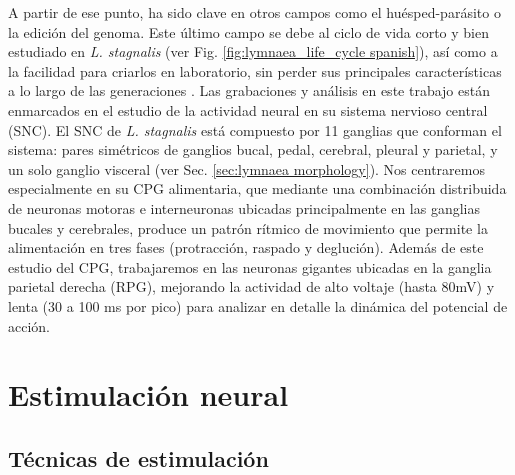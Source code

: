 A partir de ese punto, ha sido clave en otros campos como el huésped-parásito o la edición del genoma. Este último campo se debe al ciclo de vida corto y bien estudiado en \textit{L. stagnalis} (ver Fig. \ref{fig:lymnaea_life_cycle spanish}), así como a la facilidad para criarlos en laboratorio, sin perder sus principales características a lo largo de las generaciones \parencite{noland_observations_1946}. Las grabaciones y análisis en este trabajo están enmarcados en el estudio de la actividad neural en su sistema nervioso central (SNC). El SNC de \textit{L. stagnalis} está compuesto por 11 ganglias que conforman el sistema: pares simétricos de ganglios bucal, pedal, cerebral, pleural y parietal, y un solo ganglio visceral (ver Sec. \ref{sec:lymnaea morphology}). Nos centraremos especialmente en su CPG alimentaria, que mediante una combinación distribuida de neuronas motoras e interneuronas ubicadas principalmente en las ganglias bucales y cerebrales, produce un patrón rítmico de movimiento que permite la alimentación en tres fases (protracción, raspado y deglución). Además de este estudio del CPG, trabajaremos en las neuronas gigantes ubicadas en la ganglia parietal derecha (RPG), mejorando la actividad de alto voltaje (hasta 80mV) y lenta (30 a 100 ms por pico) para analizar en detalle la dinámica del potencial de acción.

\section{Estimulación neural}
\subsection{Técnicas de estimulación}

